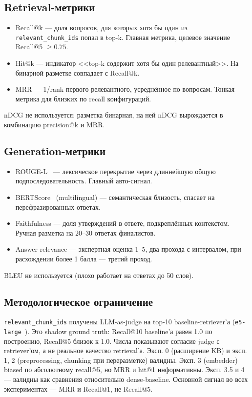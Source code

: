 \documentclass[a4paper,12pt]{extarticle}
\begin{document}
\subsection{Retrieval-метрики}
\begin{itemize}
    \item Recall@k --- доля вопросов, для которых хотя бы один из \texttt{relevant\_chunk\_ids} попал в top-k. Главная метрика, целевое значение Recall@5 $\geq 0.75$.
    \item Hit@k --- индикатор <<top-k содержит хотя бы один релевантный>>. На бинарной разметке совпадает с Recall@k.
    \item MRR --- 1/rank первого релевантного, усреднённое по вопросам. Тонкая метрика для близких по recall конфигураций.
\end{itemize}

nDCG не используется: разметка бинарная, на ней nDCG вырождается в комбинацию precision@k и MRR.

\subsection{Generation-метрики}
\begin{itemize}
    \item ROUGE-L~\cite{rouge} --- лексическое перекрытие через длиннейшую общую подпоследовательность. Главный авто-сигнал.
    \item BERTScore~\cite{bertscore} (multilingual) --- семантическая близость, спасает на перефразированных ответах.
    \item Faithfulness --- доля утверждений в ответе, подкреплённых контекстом. Ручная разметка на 20--30 ответах финалистов.
    \item Answer relevance --- экспертная оценка 1--5, два прохода с интервалом, при расхождении более 1 балла --- третий проход.
\end{itemize}

BLEU не используется (плохо работает на ответах до 50 слов).

\subsection{Методологическое ограничение}
\texttt{relevant\_chunk\_ids} получены LLM-as-judge на top-10 baseline-retriever'а (\texttt{e5-large}~\cite{e5}). Это shadow ground truth: Recall@10 baseline'а равен 1.0 по построению, Recall@5 близок к 1.0. Числа показывают согласие judge с retriever'ом, а не реальное качество retrieval'а. Эксп. 0 (расширение KB) и эксп. 1, 2 (preprocessing, chunking при переразметке) валидны. Эксп. 3 (embedder) biased по абсолютному recall@5, но MRR и hit@1 информативны. Эксп. 3.5 и 4 --- валидны как сравнения относительно dense-baseline. Основной сигнал во всех экспериментах --- MRR и Recall@1, не Recall@5.
\end{document}
